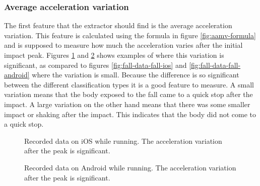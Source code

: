 \documentclass[12pt, a4paper, onecolumn]{article}
\begin{document}
	\subsubsection{Average acceleration variation}
	
	The first feature that the extractor should find is the average acceleration variation. This feature is calculated using the formula in figure \ref{fig:aamv-formula} and is supposed to measure how much the acceleration varies after the initial impact peak. Figures \ref{fig:fall-data-run-ios} and \ref{fig:fall-data-run-android} shows examples of where this variation is significant, as compared to figures \ref{fig:fall-data-fall-ios} and \ref{fig:fall-data-fall-android} where the variation is small. Because the difference is so significant between the different classification types it is a good feature to measure. A small variation means that the body exposed to the fall came to a quick stop after the impact. A large variation on the other hand means that there was some smaller impact or shaking after the impact. This indicates that the body did not come to a quick stop.
	
	\begin{figure}[H]
		\centering
		\caption{Recorded data on iOS while running. The acceleration variation after the peak is significant.}%
		\label{fig:fall-data-run-ios}%
	\end{figure}
	
	\begin{figure}[H]
		\centering
		\caption{Recorded data on Android while running. The acceleration variation after the peak is significant.}%
		\label{fig:fall-data-run-android}%
	\end{figure}
	
\end{document}
